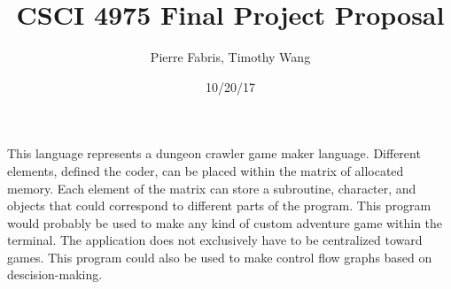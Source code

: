 \documentclass[]{article}
\title{\textbf{CSCI 4975 Final Project Proposal}}
\author{Pierre Fabris, Timothy Wang}
\date{10/20/17}
\begin{document}
    \maketitle


This language represents a dungeon crawler game maker language.
Different elements, defined the coder, can be placed within the matrix of allocated memory.
Each element of the matrix can store a subroutine, character, and objects that could correspond to different parts of the program.
This program would probably be used to make any kind of custom adventure game within the terminal.
The application does not exclusively have to be centralized toward games.
This program could also be used to make control flow graphs based on descision-making.
\end{document}
